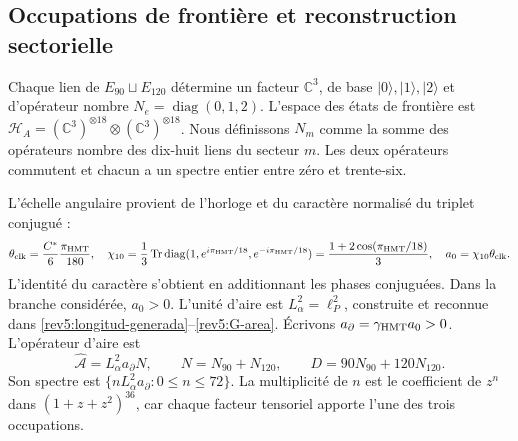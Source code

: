 

\subsection{Occupations de frontière et reconstruction sectorielle}

Chaque lien de \(E_{90}\sqcup E_{120}\) détermine un facteur
\(\mathbb C^3\), de base \(|0\rangle,|1\rangle,|2\rangle\)
et d’opérateur nombre \(N_e=\operatorname{diag}(0,1,2)\). L’espace des
états de frontière est
\(\mathscr H_A=(\mathbb C^3)^{\otimes18}\otimes
(\mathbb C^3)^{\otimes18}\). Nous définissons \(N_m\) comme la somme
des opérateurs nombre des dix-huit liens du secteur \(m\).
Les deux opérateurs commutent et chacun a un spectre entier entre
zéro et trente-six.

L’échelle angulaire provient de l’horloge et du caractère normalisé du
triplet conjugué :
\begin{equation}
 \theta_{\rm clk}=\frac{C^*}{6}\frac{\pi_{\rm HMT}}{180},
 \quad
 \chi_{10}=\frac13\operatorname{Tr}\operatorname{diag}
 (1,e^{i\pi_{\rm HMT}/18},e^{-i\pi_{\rm HMT}/18})
 =\frac{1+2\cos(\pi_{\rm HMT}/18)}3,
 \quad a_0=\chi_{10}\theta_{\rm clk}.
 \label{rev4:ae:escala}
\end{equation}
L'identité du caractère s'obtient en additionnant les phases conjuguées. Dans la branche considérée, \(a_0>0\). L'unité d'aire est \(L_\alpha^2=\ell_P^2\), construite et reconnue dans \eqref{rev5:longitud-generada}--\eqref{rev5:G-area}. Écrivons \(a_\partial=\gamma_{\rm HMT}a_0>0\). L'opérateur d'aire est
\begin{equation}
 \widehat{\mathcal A}=L_\alpha^2a_\partial N,
 \qquad N=N_{90}+N_{120},
 \qquad D=90N_{90}+120N_{120}.
 \label{rev4:ae:area}
\end{equation}
Son spectre est \(\{nL_\alpha^2a_\partial:0\le n\le72\}\).
La multiplicité de \(n\) est le coefficient de \(z^n\) dans
\((1+z+z^2)^{36}\), car chaque facteur tensoriel apporte l’une des
trois occupations.

